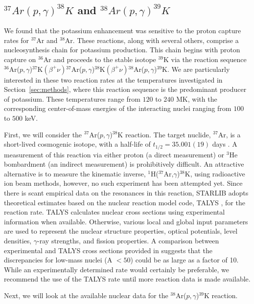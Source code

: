 \documentclass[twocolumn]{aastex6}
\newcommand{\nuclei}[2]{$^{#1}${#2}}
\newcommand{\pgreaction}[4]{\nuclei{#1}{#2}($p,\gamma$)\nuclei{#3}{#4}}
\begin{document}
\subsection{$^{37}Ar(p,\gamma)^{38}K$ and $^{38}Ar(p,\gamma)^{39}K$}
\label{sec:argon}
We found that the potassium enhancement was sensitive to the proton capture rates for \nuclei{37}{Ar} and \nuclei{38}{Ar}. 
These reactions, along with several others, comprise a nucleosynthesis chain for potassium production.
This chain begins with proton capture on \nuclei{36}{Ar} and proceeds to the stable isotope \nuclei{39}{K} via the reaction sequence \pgreaction{36}{Ar}{37}{K}$(\beta^+\nu)$\pgreaction{37}{Ar}{38}{K}$(\beta^+\nu)$\pgreaction{38}{Ar}{39}{K}. 
We are particularly interested in these two reaction rates at the temperatures investigated in Section~\ref{sec:methods}, where this reaction sequence is the predominant producer of potassium. These temperatures range from $120$ to $240$ MK, with the corresponding center-of-mass energies of the interacting nuclei ranging from $100$ to $500$ keV. 
\par
First, we will consider the \pgreaction{37}{Ar}{38}{K} reaction.
The target nuclide, \nuclei{37}{Ar}, is a short-lived cosmogenic isotope, with a half-life of $t_{1/2}=35.001(19)$ days \citep{Cameron_2012}. A measurement of this reaction via either proton (a direct measurement) or {\nuclei{3}{He}} bombardment (an indirect measurement) is prohibitively difficult. An attractive alternative is to measure the kinematic inverse, {\nuclei{1}{H}(\nuclei{37}{Ar},$\gamma$)\nuclei{38}{K}}, using radioactive ion beam methods, however, no such experiment has been attempted yet. Since there is scant empirical data on the resonances in this reaction, STARLIB adopts theoretical estimates based on the nuclear reaction model code, TALYS \citep{Konig_2004,Goriely_2008}, for the reaction rate. TALYS calculates nuclear cross sections using experimental information when available. Otherwise, various local and global input parameters are used to represent the nuclear structure properties, optical potentials, level densities, $\gamma$-ray strengths, and fission properties. A comparison between experimental and TALYS cross sections provided in \citet{Sallaska_2013} suggests that the discrepancies for low-mass nuclei (A $< 50$) could be as large as a factor of 10.
While an experimentally determined rate would certainly be preferable, we recommend the use of the TALYS rate until more reaction data is made available.
\par 
Next, we will look at the available nuclear data for the \pgreaction{38}{Ar}{39}{K} reaction.
\end{document}
